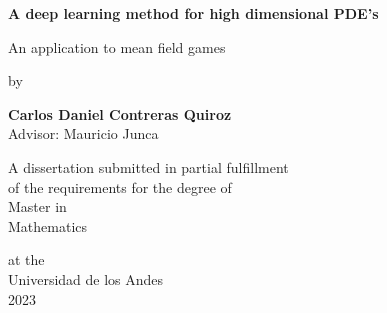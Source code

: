 \begin{titlepage}
    \begin{center}
        \vspace*{1cm}
        
        \Huge
        \textbf{A deep learning method for high dimensional PDE's}
        
        \vspace{0.5cm}
        \LARGE
        An application to mean field games\\
        \vspace{0.5cm}
   
        by\\
        \vspace{0.5cm}
    
        \textbf{Carlos Daniel Contreras Quiroz}\\
        \vspace*{1cm}
        Advisor: Mauricio Junca
        
        \vfill
        
        A dissertation submitted in partial fulfillment\\
        of the requirements for the degree of\\
        Master in\\
        Mathematics\\
    
        
        \vspace{1.8cm}

        
        \Large
        at the\\Universidad de los Andes\\
        2023\\
        \vspace{1.0cm}
       
        
    \end{center}
    
\end{titlepage}